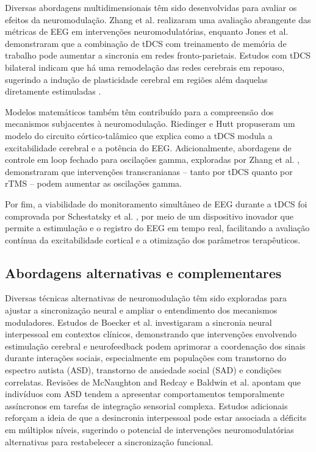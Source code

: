 Diversas abordagens multidimensionais têm sido desenvolvidas para avaliar os efeitos da neuromodulação. Zhang et al. \cite{zhang2022multidimensional} realizaram uma avaliação abrangente das métricas de EEG em intervenções neuromodulatórias, enquanto Jones et al. \cite{jones2017frontoparietal} demonstraram que a combinação de tDCS com treinamento de memória de trabalho pode aumentar a sincronia em redes fronto-parietais. Estudos com tDCS bilateral indicam que há uma remodelação das redes cerebrais em repouso, sugerindo a indução de plasticidade cerebral em regiões além daquelas diretamente estimuladas \cite{pellegrino2018bilateral}.

Modelos matemáticos também têm contribuído para a compreensão dos mecanismos subjacentes à neuromodulação. Riedinger e Hutt \cite{riedinger2022model} propuseram um modelo do circuito córtico-talâmico que explica como a tDCS modula a excitabilidade cerebral e a potência do EEG. Adicionalmente, abordagens de controle em loop fechado para oscilações gamma, exploradas por Zhang et al. \cite{zhang2024closed}, demonstraram que intervenções transcranianas – tanto por tDCS quanto por rTMS – podem aumentar as oscilações gamma. 

Por fim, a viabilidade do monitoramento simultâneo de EEG durante a tDCS foi comprovada por Schestatsky et al. \cite{schestatsky2013simultaneous}, por meio de um dispositivo inovador que permite a estimulação e o registro do EEG em tempo real, facilitando a avaliação contínua da excitabilidade cortical e a otimização dos parâmetros terapêuticos.

\subsection{Abordagens alternativas e complementares}

Diversas técnicas alternativas de neuromodulação têm sido exploradas para ajustar a sincronização neural e ampliar o entendimento dos mecanismos moduladores. Estudos de Boecker et al. \cite{boecker2024interpersonal} investigaram a sincronia neural interpessoal em contextos clínicos, demonstrando que intervenções envolvendo estimulação cerebral e neurofeedback podem aprimorar a coordenação dos sinais durante interações sociais, especialmente em populações com transtorno do espectro autista (ASD), transtorno de ansiedade social (SAD) e condições correlatas. Revisões de McNaughton and Redcay \cite{McNaughton2020} e Baldwin et al. \cite{Baldwin2022} apontam que indivíduos com ASD tendem a apresentar comportamentos temporalmente assíncronos em tarefas de integração sensorial complexa. Estudos adicionais \cite{Gerloff2022a, QuinonesCamacho2021, Key2022, Tanabe2012} reforçam a ideia de que a desincronia interpessoal pode estar associada a déficits em múltiplos níveis, sugerindo o potencial de intervenções neuromodulatórias alternativas para restabelecer a sincronização funcional.

